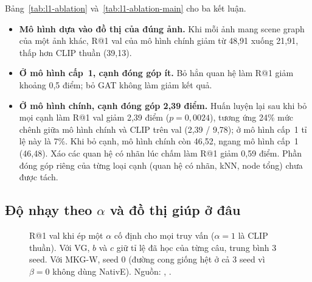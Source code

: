 Bảng~\ref{tab:l1-ablation} và~\ref{tab:l1-ablation-main} cho ba kết luận.
\begin{itemize}
\item \textbf{Mô hình dựa vào đồ thị của đúng ảnh.} Khi mỗi ảnh mang scene graph của một ảnh khác, R@1 val của mô hình chính
giảm từ 48,91 xuống 21,91, thấp hơn CLIP thuần (39,13).
\item \textbf{Ở mô hình cấp~1, cạnh đóng góp ít.} Bỏ hẳn quan hệ làm R@1 giảm khoảng 0,5 điểm; bỏ GAT không làm giảm kết quả.
\item \textbf{Ở mô hình chính, cạnh đóng góp 2,39 điểm.} Huấn luyện lại sau khi bỏ mọi cạnh làm R@1 val giảm 2,39 điểm
($p = 0{,}0024$), tương ứng 24\% mức chênh giữa mô hình chính và CLIP trên val (2,39 / 9,78); ở mô hình cấp~1 tỉ lệ này là
7\%. Khi bỏ cạnh, mô hình chính còn 46,52, ngang mô hình cấp~1 (46,48). Xáo các quan hệ có nhãn lúc chấm làm R@1 giảm 0,59
điểm. Phần đóng góp riêng của từng loại cạnh (quan hệ có nhãn, kNN, node tổng) chưa được tách.
\end{itemize}

\subsection{Độ nhạy theo $\alpha$ và đồ thị giúp ở đâu}

\begin{figure}[t]
\centering
{}
\caption{R@1 val khi ép một $\alpha$ cố định cho mọi truy vấn ($\alpha=1$ là CLIP thuần). Với VG, $b$ và $c$ giữ tỉ lệ đã
học của từng câu, trung bình 3 seed. Với MKG-W, seed 0 (đường cong giống hệt ở cả 3 seed vì $\beta=0$ không dùng NativE).
Nguồn: , .}
\label{fig:alpha}
\end{figure}

